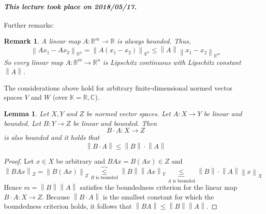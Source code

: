 \documentclass{article}
\newtheorem{lemma}{Lemma}  \numberwithin{lemma}{section}
\newtheorem{remark}{Remark}  \numberwithin{remark}{section}
\newcommand{\norm}[1]{\left\|#1\right\|}
\newcommand{\dateref}[1]{\paragraph{\textit{This lecture took place on #1.}}}
\begin{document}
\dateref{2018/05/17}

Further remarks:
\begin{remark}
  A linear map $A: \mathbb R^m \to \mathbb R$ is always bounded. Thus,
  \[ \norm{Ax_1 - Ax_2}_{\mathbb R^n} = \norm{A(x_1 - x_2)}_{\mathbb R^n} \leq \norm{A} \norm{x_1 - x_2}_{\mathbb R^m} \]
  So every linear map $A: \mathbb R^m \to \mathbb R^n$ is Lipschitz \emph{continuous} with Lipschitz constant $\norm{A}$.
\end{remark}

The considerations above hold for arbitrary finite-dimensional normed vector spaces $V$ and $W$ (over $\mathbb K = \mathbb R, \mathbb C$).

\begin{lemma} %
  Let $X, Y$ and $Z$ be normed vector spaces.
  Let $A: X \to Y$ be linear and bounded. Let $B: Y \to Z$ be linear and bounded.
  Then
  \[ B \cdot A: X \to Z \]
  is also bounded and it holds that
  \[ \norm{B \cdot A} \leq \norm{B} \cdot \norm{A} \]
\end{lemma}

\begin{proof}
  Let $x \in X$ be arbitrary and $BAx = B(Ax) \in Z$ and
  \[ \norm{BAx}_Z = \norm{B(Ax)}_Z \overbrace{\leq}_{B \text{ is bounded}} \norm{B} \norm{Ax}_Y \underbrace{\leq}_{A \text{ is bounded}} \norm{B} \cdot \norm{A} \norm{x}_X \]
  Hence $m = \norm B \norm A$ satisfies the boundedness criterion for the linear map $B \cdot A: X \to Z$. Because $\norm{B\cdot A}$ is the smallest constant
  for which the boundedness criterion holds, it follows that $\norm{BA} \leq \norm B \norm A$.
\end{proof}
\end{document}
